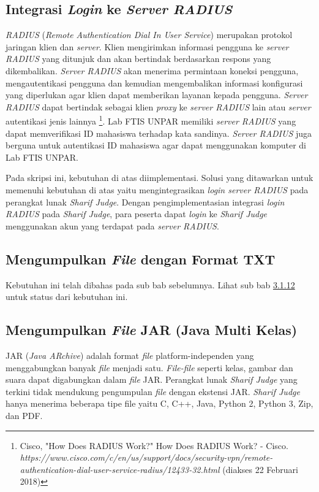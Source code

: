 \subsection{Integrasi \textit{Login} ke \textit{Server RADIUS}}
\textit{RADIUS} (\textit{Remote Authentication Dial In User Service}) merupakan protokol jaringan klien dan \textit{server}. Klien mengirimkan informasi pengguna ke \textit{server RADIUS} yang ditunjuk dan akan bertindak berdasarkan respons yang dikembalikan. \textit{Server RADIUS} akan menerima permintaan koneksi pengguna, mengautentikasi pengguna dan kemudian mengembalikan informasi konfigurasi yang diperlukan agar klien dapat memberikan layanan kepada pengguna. \textit{Server RADIUS} dapat bertindak sebagai klien \textit{proxy} ke \textit{server RADIUS} lain atau \textit{server} autentikasi jenis lainnya \footnote{Cisco, "How Does RADIUS Work?" How Does RADIUS Work? - Cisco. \textit{https://www.cisco.com/c/en/us/support/docs/security-vpn/remote-authentication-dial-user-service-radius/12433-32.html} (diakses 22 Februari 2018)}. %
Lab FTIS UNPAR memiliki \textit{server RADIUS} yang dapat memverifikasi ID mahasiswa terhadap kata sandinya. \textit{Server RADIUS} juga berguna untuk autentikasi ID mahasiswa agar dapat menggunakan komputer di Lab FTIS UNPAR.

Pada skripsi ini, kebutuhan di atas diimplementasi. Solusi yang ditawarkan untuk memenuhi kebutuhan di atas yaitu mengintegrasikan \textit{login server RADIUS} pada perangkat lunak \textit{Sharif Judge}. Dengan pengimplementasian integrasi \textit{login RADIUS} pada \textit{Sharif Judge}, para peserta dapat \textit{login} ke \textit{Sharif Judge} menggunakan akun yang terdapat pada \textit{server RADIUS}. 

\subsection{Mengumpulkan \textit{File} dengan Format TXT}
Kebutuhan ini telah dibahas pada sub bab sebelumnya. Lihat sub bab \hyperref[subsec:filetxt]{3.1.12} untuk status dari kebutuhan ini.

\subsection{Mengumpulkan \textit{File} JAR (Java Multi Kelas)}
JAR (\textit{Java ARchive}) adalah format \textit{file} platform-independen yang menggabungkan banyak \textit{file} menjadi satu. \textit{File-file} seperti kelas, gambar dan suara dapat digabungkan dalam \textit{file} JAR. Perangkat lunak \textit{Sharif Judge} yang terkini tidak mendukung pengumpulan \textit{file} dengan ekstensi JAR. \textit{Sharif Judge} hanya menerima beberapa tipe file yaitu C, C++, Java, Python 2, Python 3, Zip, dan PDF.


